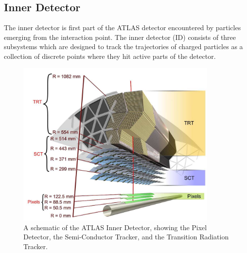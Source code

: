 \subsection{Inner Detector}
The inner detector is first part of the ATLAS detector encountered by particles emerging from the interaction point.
The inner detector (ID) consists of three subsystems which are designed to track the trajectories of charged particles as a collection of discrete points where they hit active parts of the detector.

\begin{figure}
  \begin{center}
    \includegraphics[width=100mm]{figures/atlas/InnerDetector.jpg}
  \end{center}
  \caption{A schematic of the ATLAS Inner Detector, showing the Pixel Detector, the Semi-Conductor Tracker, and the Transition Radiation Tracker.}
  \label{img:InnerDetector}
\end{figure}


